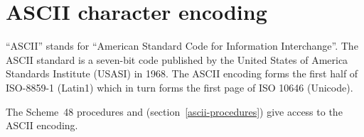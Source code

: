 
\T\appendix
\chapter{ASCII character encoding}
\label{ascii-chart}


``ASCII'' stands for ``American Standard Code for Information Interchange''.
The ASCII standard is a seven-bit code published by the United States of
 America Standards Institute (USASI) in 1968.
The ASCII encoding forms the first half of ISO-8859-1 (Latin1) which in
 turn forms the first page of ISO 10646 (Unicode).

The Scheme~48 procedures
 and
\T (section~\ref{ascii-procedures})
 give access to the ASCII encoding.



